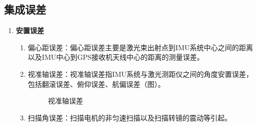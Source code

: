 \subsection{集成误差}
\begin{enumerate}
	\item \textbf{安置误差}
	\begin{enumerate}
		\item {\cukai 偏心距误差}：偏心距误差主要是激光束出射点到IMU系统中心之间的距离以及IMU中心到GPS接收机天线中心的距离的测量误差。
		\item {\cukai 视准轴误差}：视准轴误差指IMU系统与激光测距仪之间的角度安置误差，包括翻滚误差、俯仰误差、航偏误差（图）。
		\begin{figure}[htbp]
			\centering
			 \hspace{3em}
			 \hspace{3em}
			\caption{视准轴误差}
			\label{fig:视准轴误差}
		\end{figure}
		\item {\cukai 扫描角误差}：扫描电机的非匀速扫描以及扫描转镜的震动等引起。
		

\end{enumerate}
\end{enumerate}

